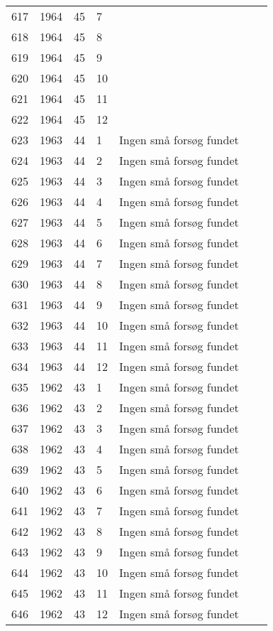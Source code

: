 \begin{longtable}{ |l|l|l|l|l|l|l| }
617 & 1964 & 45 & 7 &  &  &  \\
618 & 1964 & 45 & 8 &  &  &  \\
619 & 1964 & 45 & 9 &  &  &  \\
620 & 1964 & 45 & 10 &  &  &  \\
621 & 1964 & 45 & 11 &  &  &  \\
622 & 1964 & 45 & 12 &  &  &  \\
623 & 1963 & 44 & 1 & Ingen små forsøg fundet &  &  \\
624 & 1963 & 44 & 2 & Ingen små forsøg fundet &  &  \\
625 & 1963 & 44 & 3 & Ingen små forsøg fundet &  &  \\
626 & 1963 & 44 & 4 & Ingen små forsøg fundet &  &  \\
627 & 1963 & 44 & 5 & Ingen små forsøg fundet &  &  \\
628 & 1963 & 44 & 6 & Ingen små forsøg fundet &  &  \\
629 & 1963 & 44 & 7 & Ingen små forsøg fundet &  &  \\
630 & 1963 & 44 & 8 & Ingen små forsøg fundet &  &  \\
631 & 1963 & 44 & 9 & Ingen små forsøg fundet &  &  \\
632 & 1963 & 44 & 10 & Ingen små forsøg fundet &  &  \\
633 & 1963 & 44 & 11 & Ingen små forsøg fundet &  &  \\
634 & 1963 & 44 & 12 & Ingen små forsøg fundet &  &  \\
635 & 1962 & 43 & 1 & Ingen små forsøg fundet &  &  \\
636 & 1962 & 43 & 2 & Ingen små forsøg fundet &  &  \\
637 & 1962 & 43 & 3 & Ingen små forsøg fundet &  &  \\
638 & 1962 & 43 & 4 & Ingen små forsøg fundet &  &  \\
639 & 1962 & 43 & 5 & Ingen små forsøg fundet &  &  \\
640 & 1962 & 43 & 6 & Ingen små forsøg fundet &  &  \\
641 & 1962 & 43 & 7 & Ingen små forsøg fundet &  &  \\
642 & 1962 & 43 & 8 & Ingen små forsøg fundet &  &  \\
643 & 1962 & 43 & 9 & Ingen små forsøg fundet &  &  \\
644 & 1962 & 43 & 10 & Ingen små forsøg fundet &  &  \\
645 & 1962 & 43 & 11 & Ingen små forsøg fundet &  &  \\
646 & 1962 & 43 & 12 & Ingen små forsøg fundet &  &  \\
\end{longtable}
